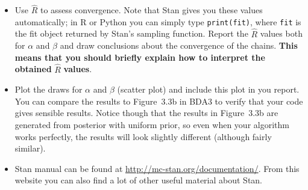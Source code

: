 \documentclass[a4paper,11pt]{article}
\begin{document}
\begin{itemize}
\item Use $\hat{R}$ to assess convergence. Note that Stan gives you these values automatically; in R or Python you can simply type {\tt print(fit)}, where {\tt fit} is the fit object returned by Stan's sampling function. Report the $\hat R$ values both for $\alpha$ and $\beta$ and draw conclusions about the convergence of the chains.
\textbf{This means that you should briefly explain how to interpret the obtained} $\hat R$ \textbf{values}.

\item Plot the draws for $\alpha$ and $\beta$ (scatter plot) and include this plot in you report. You can compare the results to Figure~3.3b in BDA3 to verify that your code gives sensible results. Notice though that the results in Figure~3.3b are generated from posterior with uniform prior, so even when your algorithm works perfectly, the results will look slightly different (although fairly similar).

\item Stan manual can be found at \url{http://mc-stan.org/documentation/}. From this website you can also find a lot of other useful material about Stan. 


\end{itemize}
\end{document}
